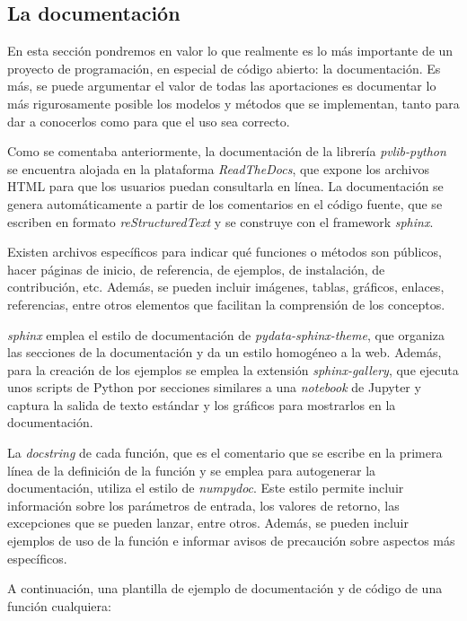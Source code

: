 \subsection{La documentación}

En esta sección pondremos en valor lo que realmente es lo más importante de un proyecto de programación, en especial de código abierto: la documentación. Es más, se puede argumentar el valor de todas las aportaciones es documentar lo más rigurosamente posible los modelos y métodos que se implementan, tanto para dar a conocerlos como para que el uso sea correcto.

Como se comentaba anteriormente, la documentación de la librería \textit{pvlib-python} se encuentra alojada en la plataforma \textit{ReadTheDocs}, que expone los archivos HTML para que los usuarios puedan consultarla en línea. La documentación se genera automáticamente a partir de los comentarios en el código fuente, que se escriben en formato \textit{reStructuredText} y se construye con el framework \textit{sphinx}.

Existen archivos específicos para indicar qué funciones o métodos son públicos, hacer páginas de inicio, de referencia, de ejemplos, de instalación, de contribución, etc. Además, se pueden incluir imágenes, tablas, gráficos, enlaces, referencias, entre otros elementos que facilitan la comprensión de los conceptos.

\textit{sphinx} emplea el estilo de documentación de \textit{pydata-sphinx-theme}, que organiza las secciones de la documentación y da un estilo homogéneo a la web. Además, para la creación de los ejemplos se emplea la extensión \textit{sphinx-gallery}, que ejecuta unos scripts de Python por secciones similares a una \textit{notebook} de Jupyter y captura la salida de texto estándar y los gráficos para mostrarlos en la documentación.

La \textit{docstring} de cada función, que es el comentario que se escribe en la primera línea de la definición de la función y se emplea para autogenerar la documentación, utiliza el estilo de \textit{numpydoc}. Este estilo permite incluir información sobre los parámetros de entrada, los valores de retorno, las excepciones que se pueden lanzar, entre otros. Además, se pueden incluir ejemplos de uso de la función e informar avisos de precaución sobre aspectos más específicos.

A continuación, una plantilla de ejemplo de documentación y de código de una función cualquiera:

